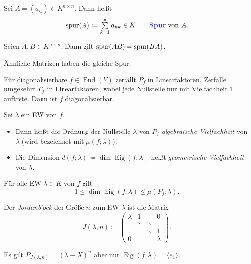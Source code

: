 \documentclass{cheat-sheet}
\DeclareMathOperator{\End}{End}
\DeclareMathOperator{\Eig}{Eig}
\begin{document}
\begin{defn}
  Sei $A = (a_{ij}) \in K^{n \times n}$. Dann heißt
  \[
    \spur(A) \coloneqq \sum_{k=1}^n a_{kk} \in K
    \qquad \text{\emph{Spur} von $A$.}
  \]
\end{defn}

\begin{satz}
  Seien $A, B \in K^{n \times n}$. Dann gilt $\mathrm{spur}(AB) = \mathrm{spur}(BA)$.
\end{satz}

\begin{kor}
  Ähnliche Matrizen haben die gleiche Spur.
\end{kor}

\begin{satz}
  Für diagonalisierbare $f \in \End(V)$ zerfällt $P_f$ in Linearfaktoren. Zerfalle umgekehrt $P_f$ in Linearfaktoren, wobei jede Nullstelle nur mit Vielfachheit $1$ auftrete. Dann ist $f$ diagonalisierbar.
\end{satz}

\begin{defn}
  Sei $\lambda$ ein EW von $f$.
  \begin{itemize}
    \item Dann heißt die Ordnung der Nullstelle $\lambda$ von $P_f$ \emph{algebraische Vielfachheit} von $\lambda$ (wird bezeichnet mit $\mu(f; \lambda)$).
    \item Die Dimension $d(f; \lambda) \coloneqq \dim \Eig(f; \lambda)$ heißt \emph{geometrische Vielfachheit} von $\lambda$.
  \end{itemize}
\end{defn}

\begin{satz}
  Für alle EW $\lambda \in K$ von $f$ gilt
  \[ 1 \le \dim \Eig(f; \lambda) \le \mu(P_f; \lambda). \]
\end{satz}

\begin{defn}
  Der \emph{Jordanblock} der Größe $n$ zum EW $\lambda$ ist die Matrix
  \[ J(\lambda, n) \coloneqq \begin{pmatrix}
    \lambda & 1 & & 0 \\
    & \ddots & \ddots & \\
    & & \ddots & 1 \\
    0 & & & \lambda
  \end{pmatrix}. \]
\end{defn}

\begin{bem}
  Es gilt $P_{J(\lambda, n)} = (\lambda - X)^n$ aber nur $\Eig(f; \lambda) = \langle e_1 \rangle$.
\end{bem}
\end{document}
